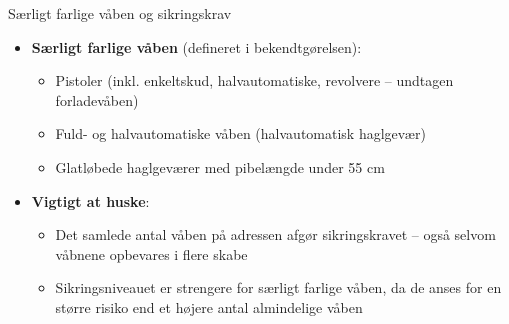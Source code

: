 \begin{frame}{Særligt farlige våben og sikringskrav}

\begin{itemize}
    \item \textbf{Særligt farlige våben} (defineret i bekendtgørelsen):
    \begin{itemize}
        \item Pistoler (inkl. enkeltskud, halvautomatiske, revolvere – undtagen forladevåben)
        \item Fuld- og halvautomatiske våben (halvautomatisk haglgevær)
        \item Glatløbede haglgeværer med pibelængde under 55 cm
    \end{itemize}
    \vspace{1em}
    \item \textbf{Vigtigt at huske}:
    \begin{itemize}
        \item Det samlede antal våben på adressen afgør sikringskravet – også selvom våbnene opbevares i flere skabe
        \item Sikringsniveauet er strengere for særligt farlige våben, da de anses for en større risiko end et højere antal almindelige våben
    \end{itemize}
\end{itemize}

\end{frame}